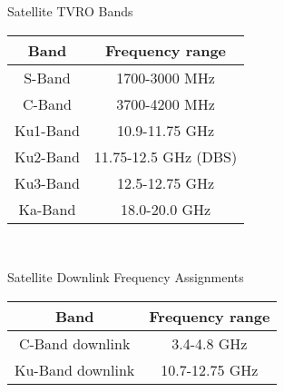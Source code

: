
{

\centering

Satellite TVRO Bands\\
\begin{tabular}{|c|c|}\hline
Band     & Frequency range      \\ \hline
S-Band   & 1700-3000 MHz        \\
C-Band   & 3700-4200 MHz        \\
Ku1-Band & 10.9-11.75 GHz       \\
Ku2-Band & 11.75-12.5 GHz (DBS) \\
Ku3-Band & 12.5-12.75 GHz       \\
Ka-Band  & 18.0-20.0 GHz        \\
\hline
\end{tabular}\\

\vspace{0.1in}

Satellite Downlink Frequency Assignments\\
\begin{tabular}{|c|c|}\hline
Band     & Frequency range          \\ \hline
C-Band downlink   & 3.4-4.8 GHz     \\
Ku-Band downlink  & 10.7-12.75 GHz  \\
\hline
\end{tabular}\\

}
